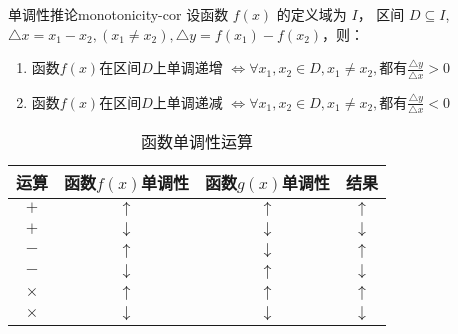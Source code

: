 \begin{corollary}{单调性推论}{monotonicity-cor}
设函数 $f(x)$ 的定义域为 $I$， 区间 \underline{$D \subseteq I$}, $\bigtriangleup x = x_1 - x_2, (x_1 \neq x_2), \bigtriangleup y = f(x_1) - f(x_2)$，则：
\begin{enumerate}
\item \vspace{2mm} 函数$f(x)$在区间$D$上\textcolor{third}{单调递增} $\iff \forall x_1, x_2 \in D, x_1 \neq x_2, \mbox{都有} \displaystyle \frac{\bigtriangleup y}{\bigtriangleup x} > 0$
\item \vspace{2mm} 函数$f(x)$在区间$D$上\textcolor{third}{单调递减} $\iff \forall x_1, x_2 \in D, x_1 \neq x_2, \mbox{都有} \displaystyle \frac{\bigtriangleup y}{\bigtriangleup x} < 0$
\end{enumerate}
\end{corollary}


\begin{table}[htbp]
  \caption{函数单调性运算\label{tab:color thm}}
  \centering
  \begin{tabular}{cccc}
  \toprule
              运算
              & 函数$f(x)$单调性
              & 函数$g(x)$单调性
              & 结果\\
  \midrule
              $+$ 
              & $\uparrow $
              & $\uparrow $
              & $\uparrow $\\
              $+$
              & $\downarrow $
              & $\downarrow $
              & $\downarrow $\\
              $-$
              & $\uparrow $
              & $\downarrow $
              & $\uparrow $\\
              $-$
              & $\downarrow $
              & $\uparrow $
              & $\downarrow $\\
              $ \times $
              & $\uparrow $
              & $\uparrow $
              & $\uparrow $\\
              $ \times $
              & $\downarrow $
              & $\downarrow $
              & $\downarrow $\\
  \bottomrule
  \end{tabular}
\end{table}





